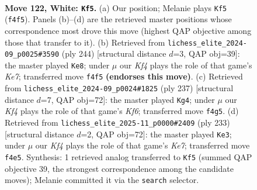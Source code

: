 \documentclass[11pt]{article}
\begin{document}
\clearpage

\begin{figure}[p]\centering
\begin{subfigure}{0.46\textwidth}\centering
\resizebox{\linewidth}{!}{%
\newchessgame
\chessboard[
  setfen={8/4k3/R7/8/1r3KP1/8/8/4N3 w - - 27 122},
  showmover=false,
  pgfstyle=straightmove, color=movearrow, markmove={f4-f5}
]}
\caption{}
\end{subfigure}\hfill
\begin{subfigure}{0.46\textwidth}\centering
\resizebox{\linewidth}{!}{%
\newchessgame
\chessboard[
  setfen={8/2r1KP1k/8/8/8/8/8/6R1 w - - 3 123},
  showmover=false,
  pgfstyle=straightmove, color=movearrow, markmove={e7-e8}
]}
\caption{}
\end{subfigure}
\\[4pt]
\begin{subfigure}{0.46\textwidth}\centering
\resizebox{\linewidth}{!}{%
\newchessgame
\chessboard[
  setfen={8/5R2/8/8/8/3K1k2/6p1/8 b - - 3 119},
  showmover=false,
  pgfstyle=straightmove, color=movearrow, markmove={f3-g4}
]}
\caption{}
\end{subfigure}\hfill
\begin{subfigure}{0.46\textwidth}\centering
\resizebox{\linewidth}{!}{%
\newchessgame
\chessboard[
  setfen={8/8/6r1/8/8/7K/R3kp2/8 b - - 3 117},
  showmover=false,
  pgfstyle=straightmove, color=movearrow, markmove={e2-e3}
]}
\caption{}
\end{subfigure}
\caption{\textbf{Move 122, White: \texttt{Kf5}.} (a) Our position; Melanie plays \texttt{Kf5} (\texttt{f4f5}). Panels (b)--(d) are the retrieved master positions whose correspondence most drove this move (highest QAP objective among those that transfer to it). (b) Retrieved from \texttt{lichess\_elite\_2024-09\_p0025\#3590} (ply 244) [structural distance $d$=3, QAP obj=39]: the master played \texttt{Ke8}; under $\mu$ our \emph{Kf4} plays the role of that game's \emph{Ke7}; transferred move \texttt{f4f5} \textbf{(endorses this move)}. (c) Retrieved from \texttt{lichess\_elite\_2024-09\_p0024\#1825} (ply 237) [structural distance $d$=7, QAP obj=72]: the master played \texttt{Kg4}; under $\mu$ our \emph{Kf4} plays the role of that game's \emph{Kf6}; transferred move \texttt{f4g5}. (d) Retrieved from \texttt{lichess\_elite\_2025-11\_p0000\#2409} (ply 233) [structural distance $d$=2, QAP obj=72]: the master played \texttt{Ke3}; under $\mu$ our \emph{Kf4} plays the role of that game's \emph{Ke7}; transferred move \texttt{f4e5}. Synthesis: 1 retrieved analog transferred to \texttt{Kf5} (summed QAP objective 39, the strongest correspondence among the candidate moves); Melanie committed it via the \texttt{search} selector.}
\label{fig:thought-m242}
\end{figure}
\end{document}
